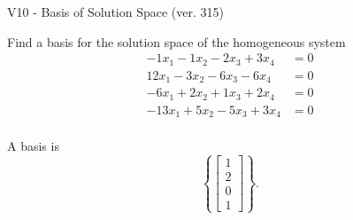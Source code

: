 \begin{exercise}
  \begin{exerciseTitle}V10 - Basis of Solution Space (ver. 315)\end{exerciseTitle}
  \begin{exerciseStatement}
    Find a basis for the solution space of the homogeneous system 
\begin{align*}
 -1 x_ 1 -1 x_ 2 -2 x_ 3 + 3 x_ 4 &= 0  \\ 
  12 x_ 1 -3 x_ 2 -6 x_ 3 -6 x_ 4 &= 0  \\ 
  -6 x_ 1 + 2 x_ 2 + 1 x_ 3 + 2 x_ 4 &= 0  \\ 
  -13 x_ 1 + 5 x_ 2 -5 x_ 3 + 3 x_ 4 &= 0  \\ 
 \end{align*}


 
  \end{exerciseStatement}

  \begin{exerciseAnswer}
   A basis is   
\[\left\{\left[\begin{array}{c}
1 \\
2 \\
0 \\
1
\end{array}\right]\right\}.\]

  


  \end{exerciseAnswer}
\end{exercise}